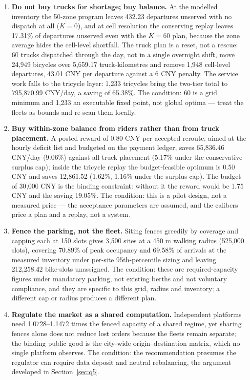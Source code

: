 \begin{enumerate}[leftmargin=1.6em]
\item \textbf{Do not buy trucks for shortage; buy balance.} At the modelled inventory
  the 50-zone program leaves 432.23 departures unserved with no dispatch at all
  ($K=0$), and at cell resolution the conserving replay leaves 17.31\% of departures
  unserved even with the $K=60$ plan, because the zone average hides the cell-level
  shortfall. The truck plan is a reset, not a rescue: 60 trucks dispatched through
  the day, not in a single overnight shift, move 24,949 bicycles over 5,659.17
  truck-kilometres and remove 1,948 cell-level departures, 43.01 CNY per departure
  against a 6 CNY penalty. The service work falls to the tricycle layer: 1,233
  tricycles bring the two-tier total to 795,870.99 CNY/day, a saving of 65.38\%.
  The condition: 60 is a grid minimum and 1,233 an executable fixed point, not global
  optima --- treat the fleets as bounds and re-scan them locally.
\item \textbf{Buy within-zone balance from riders rather than from truck placement.} A posted reward
  of 0.80 CNY per accepted reroute, aimed at the hourly deficit list and budgeted on
  the payment ledger, saves 65,836.46 CNY/day (9.06\%) against all-truck placement
  (5.17\% under the conservative surplus cap); inside the tricycle replay the
  budget-feasible optimum is 0.50 CNY and saves 12,861.52 (1.62\%, 1.16\% under the
  surplus cap). The budget of 30,000
  CNY is the binding constraint:
  without it the reward would be 1.75 CNY and the saving 19.05\%. The condition: this
  is a pilot design, not a measured price --- the acceptance parameters are assumed,
  and the calibers price a plan and a replay, not a system.
\item \textbf{Fence the parking, not the fleet.} Siting fences greedily by coverage
  and capping each at 150 slots gives 3,500 sites at a 450 m walking radius (525,000
  slots), covering 70.89\% of peak occupancy and 69.58\% of arrivals at the measured
  inventory under per-site 95th-percentile sizing and leaving 212,258.42 bike-slots
  unassigned. The condition: these are
  required-capacity figures under mandatory parking, not existing berths and not
  voluntary compliance, and they are specific to this grid, radius and inventory; a
  different cap or radius produces a different plan.
\item \textbf{Regulate the market as a shared computation.} Independent platforms
  need 1.0728--1.1472 times the fenced capacity of a shared regime, yet sharing
  fences alone does not reduce lost orders because the fleets remain separate; the
  binding public good is the city-wide origin--destination matrix, which no single
  platform observes. The condition: the recommendation presumes the regulator can
  require data deposit and neutral rebalancing, the argument developed in
  Section~\ref{sec:q5}.
\end{enumerate}

